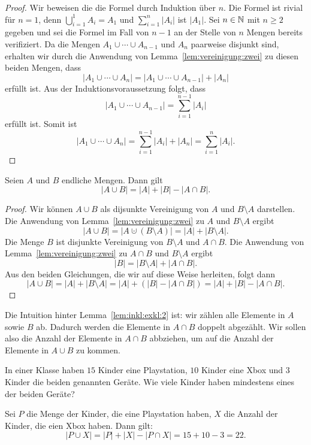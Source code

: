 \begin{proof} 
	Wir beweisen die die Formel durch Induktion über $n$. 
	Die Formel ist rivial für $n=1$, denn $\bigcup_{i=1}^1 A_i = A_1$ und $\sum_{i=1}^n |A_i|$ ist $|A_1|$. 
	Sei $n \in \mathbb{N}$ mit $n \ge 2$ gegeben und sei die Formel im Fall von $n-1$ an der Stelle von $n$ Mengen bereits verifiziert. Da die Mengen $A_1 \cup \cdots \cup A_{n-1}$ und $A_n$ paarweise disjunkt sind, erhalten wir durch die Anwendung von Lemma~\ref{lem:vereinigung:zwei} zu diesen beiden Mengen, dass 
	\[
		| A_1 \cup \cdots \cup A_n| = |A_1 \cup \cdots \cup A_{n-1} | + |A_n| 
	\]
	erfüllt ist. Aus der Induktionsvoraussetzung folgt, dass 
	\[
		| A_1 \cup \cdots \cup A_{n-1} | = \sum_{i=1}^{n-1} |A_i|
	\]
	erfüllt ist. Somit ist 
	\[
		| A_1 \cup \cdots \cup A_n| = \sum_{i=1}^{n-1} |A_i|  + |A_n| = \sum_{i=1}^n |A_i|. 
	\]
\end{proof} 

\begin{lem} \label{lem:inkl:exkl:2}
	Seien $A$ und $B$ endliche Mengen. Dann gilt 
	\[
		|A \cup B| = |A| + |B| - |A \cap B|. 
	\]
\end{lem}

\begin{proof}
		Wir können $A \cup B$ als dijsunkte Vereinigung von $A$ und $B \setminus A$ darstellen. Die Anwendung von Lemma~\ref{lem:vereinigung:zwei} zu $A$ und $B \setminus A$ ergibt 
		\[
			| A \cup B| = |A \cupdot (B \setminus A)| = |A | + |B \setminus A|. 
		\]
		Die Menge $B$ ist disjunkte Vereinigung von $B \setminus A$ und $A \cap B$. Die Anwendung von Lemma~\ref{lem:vereinigung:zwei} zu $A \cap B$ und $B \setminus A$ ergibt
		\[
			|B| = |B \setminus A| + |A \cap B|. 
		\]
		Aus den beiden Gleichungen, die wir auf diese Weise herleiten, folgt dann 
		\[
			| A \cup B|  = |A | + |B \setminus A| = |A| + (|B| - | A \cap B|) = |A| + |B| - | A \cap B|. 
		\]
\end{proof} 

\begin{bem}
	Die Intuition hinter Lemma~\ref{lem:inkl:exkl:2} ist: wir zählen alle Elemente in $A$ sowie $B$ ab. Dadurch werden die Elemente in $A \cap B$ doppelt abgezählt. Wir sollen also die Anzahl der Elemente in $A \cap B$ abbziehen, um auf die Anzahl der Elemente in $A \cup B$ zu kommen. 
\end{bem} 

\begin{bsp}
	In einer Klasse haben $15$ Kinder eine Playstation, $10$ Kinder eine Xbox und $3$ Kinder die beiden genannten Geräte. Wie viele Kinder haben mindestens eines der beiden Geräte? 
	
	Sei $P$ die Menge der Kinder, die eine Playstation haben, $X$ die Anzahl der Kinder, die eien Xbox haben. Dann gilt: 
	\[
		|P \cup X| = |P| + |X| - |P \cap X| = 15 + 10 - 3 = 22. 
	\]
\end{bsp} 

